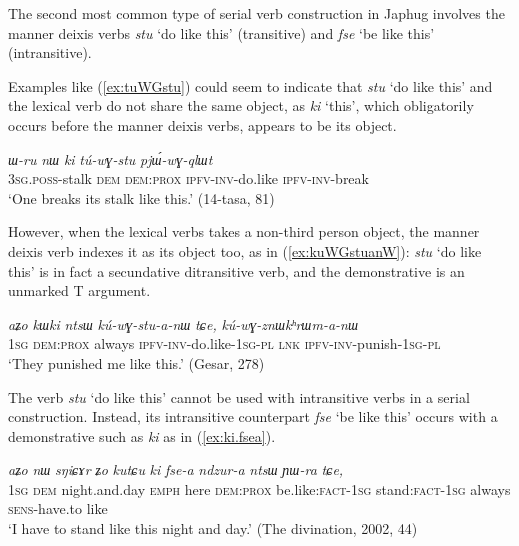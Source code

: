 \documentclass[oneside,a4paper,11pt]{article}
\newcommand{\ipa}[1]{\textit{\phon#1}}
\newcommand{\jpg}[2]{\ipa{#1} `#2'}
\begin{document}
The second most common type of serial verb construction in Japhug involves the manner deixis verbs \jpg{stu}{do like this} (transitive) and \jpg{fse}{be like this} (intransitive). 

Examples like (\ref{ex:tuWGstu}) could seem to indicate that \jpg{stu}{do like this} and the lexical verb do not share the same object, as  \jpg{ki}{this}, which obligatorily occurs before the manner deixis verbs, appears to be its object. 

\begin{exe}
\ex \label{ex:tuWGstu}
\gll 	
\ipa{ɯ-ru} 	\ipa{nɯ} 	\ipa{ki} 	\ipa{tú-wɣ-stu} 	\ipa{pjɯ́-wɣ-qlɯt} \\
\textsc{3sg.poss}-stalk \textsc{dem} \textsc{dem:prox} \textsc{ipfv-inv}-do.like \textsc{ipfv-inv}-break \\
\glt `One breaks its stalk like this.' (14-tasa, 81)
\end{exe}	

However, when the lexical verbs takes a non-third person object, the manner deixis verb indexes it as its object too, as in (\ref{ex:kuWGstuanW}): \jpg{stu}{do like this} is in fact a secundative ditransitive verb, and the demonstrative is an unmarked T argument.

\begin{exe}
\ex \label{ex:kuWGstuanW}
\gll 	
 \ipa{aʑo} 	\ipa{kɯki} 	\ipa{ntsɯ} 	\ipa{kú-wɣ-stu-a-nɯ} 	\ipa{tɕe,} 	\ipa{kú-wɣ-znɯkʰrɯm-a-nɯ} \\
 \textsc{1sg} \textsc{dem:prox} always \textsc{ipfv-inv}-do.like-\textsc{1sg-pl} \textsc{lnk} \textsc{ipfv-inv}-punish-\textsc{1sg-pl} \\
 \glt `They punished me like this.' (Gesar, 278)
\end{exe}	

The verb \jpg{stu}{do like this} cannot be used with intransitive verbs in a serial construction. Instead, its intransitive counterpart \jpg{fse}{be like this} occurs with a demonstrative such as \ipa{ki} as in (\ref{ex:ki.fsea}).

\begin{exe}
\ex \label{ex:ki.fsea}
\gll \ipa{aʑo} 	\ipa{nɯ} 	\ipa{sŋiɕɤr} 	\ipa{ʑo} 	\ipa{kutɕu} 	\ipa{ki} 	\ipa{fse-a} 	\ipa{ndzur-a} 	\ipa{ntsɯ} 	\ipa{ɲɯ-ra} 	\ipa{tɕe,} \\
\textsc{1sg} \textsc{dem} night.and.day \textsc{emph} here \textsc{dem:prox} be.like:\textsc{fact-1sg} stand:\textsc{fact-1sg} always \textsc{sens}-have.to like \\
\glt `I have to stand like this night and day.' (The divination, 2002, 44)
\end{exe}
\end{document}
